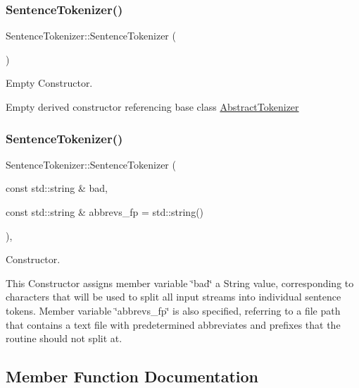\subsubsection{\texorpdfstring{Sentence\+Tokenizer()}{SentenceTokenizer()}\hspace{0.1cm}{\footnotesize\ttfamily [1/2]}}
{\footnotesize\ttfamily Sentence\+Tokenizer\+::\+Sentence\+Tokenizer (\begin{DoxyParamCaption}{ }\end{DoxyParamCaption})\hspace{0.3cm}{\ttfamily [inline]}}



Empty Constructor. 

Empty derived constructor referencing base class \hyperlink{class_abstract_tokenizer}{Abstract\+Tokenizer} \mbox{\label{class_sentence_tokenizer_a7788c34102dd503c2df5fd51987dedd8}} 
\subsubsection{\texorpdfstring{Sentence\+Tokenizer()}{SentenceTokenizer()}\hspace{0.1cm}{\footnotesize\ttfamily [2/2]}}
{\footnotesize\ttfamily Sentence\+Tokenizer\+::\+Sentence\+Tokenizer (\begin{DoxyParamCaption}\item[{const std\+::string \&}]{bad,  }\item[{const std\+::string \&}]{abbrevs\+\_\+fp = {\ttfamily std\+:\+:string()} }\end{DoxyParamCaption})\hspace{0.3cm}{\ttfamily [inline]}, {\ttfamily [explicit]}}



Constructor. 

This Constructor assigns member variable \char`\"{}bad\char`\"{} a String value, corresponding to characters that will be used to split all input streams into individual sentence tokens. Member variable \char`\"{}abbrevs\+\_\+fp\char`\"{} is also specified, referring to a file path that contains a text file with predetermined abbreviates and prefixes that the routine should not split at. 

\subsection{Member Function Documentation}
\mbox{\label{class_sentence_tokenizer_a8779c5491a643a76cc7ce5ded0c28d07}} 
